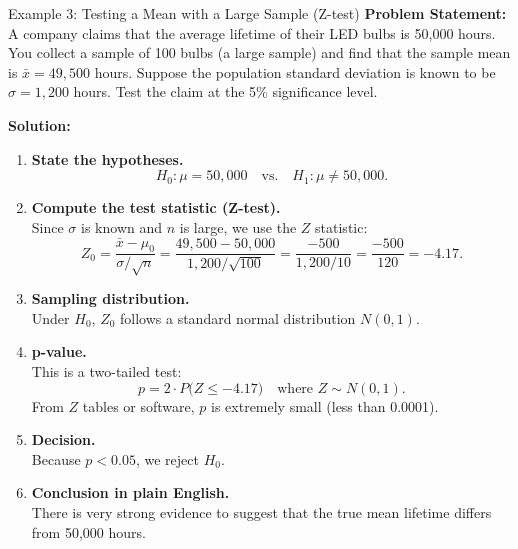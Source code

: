 \documentclass[9pt]{extarticle}
\begin{document}
\begin{examplebox}{Example 3: Testing a Mean with a Large Sample (Z-test)}{}
\scriptsize\textbf{Problem Statement:}\\
A company claims that the average lifetime of their LED bulbs is 50{,}000 hours. You collect a sample of 100 bulbs (a large sample) and find that the sample mean is $\bar{x} = 49{,}500$ hours. Suppose the population standard deviation is known to be $\sigma = 1{,}200$ hours. Test the claim at the 5\% significance level.

\textbf{Solution:}\\
\begin{enumerate}
    \item \textbf{State the hypotheses.}\\
    \[
        H_0: \mu = 50{,}000
        \quad \text{vs.} \quad
        H_1: \mu \neq 50{,}000.
    \]
    \item \textbf{Compute the test statistic (Z-test).}\\
    Since $\sigma$ is known and $n$ is large, we use the $Z$ statistic:
    \[
        Z_0 = \frac{\bar{x} - \mu_0}{\sigma / \sqrt{n}}
        = \frac{49{,}500 - 50{,}000}{1{,}200 / \sqrt{100}}
        = \frac{-500}{1{,}200 / 10}
        = \frac{-500}{120}
        = -4.17.
    \]
    \item \textbf{Sampling distribution.}\\
    Under $H_0$, $Z_0$ follows a standard normal distribution $N(0,1)$.
    \item \textbf{p-value.}\\
    This is a two-tailed test:
    \[
        p = 2 \cdot P\big(Z \leq -4.17\big)\quad\text{where }Z \sim N(0,1).
    \]
    From $Z$ tables or software, $p$ is extremely small (less than 0.0001).
    \item \textbf{Decision.}\\
    Because $p < 0.05$, we reject $H_0$.
    \item \textbf{Conclusion in plain English.}\\
    There is very strong evidence to suggest that the true mean lifetime differs from 50{,}000 hours.
\end{enumerate}
\end{examplebox}
\end{document}
